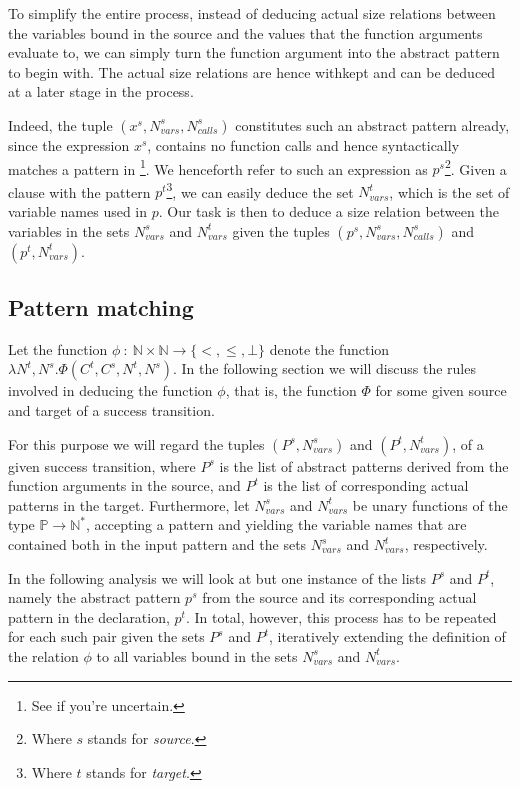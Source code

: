 To simplify the entire process, instead of deducing actual size relations
between the variables bound in the source and the values that the function
arguments evaluate to, we can simply turn the function argument into the
abstract pattern to begin with. The actual size relations are hence withkept
and can be deduced at a later stage in the process.

Indeed, the tuple $(x^s,N_{vars}^s,N_{calls}^s)$ constitutes such an abstract
pattern already, since the expression $x^s$, contains no function calls and
hence syntactically matches a pattern in \D{}\footnote{See
 if you're uncertain.}. We henceforth refer to such an
expression as $p^s$\footnote{Where $s$ stands for \emph{source}.}. Given a
clause with the pattern $p^t$\footnote{Where $t$ stands for \emph{target}.}, we
can easily deduce the set $N_{vars}^t$, which is the set of variable names used
in $p$. Our task is then to deduce a size relation between the variables in the
sets $N_{vars}^s$ and $N_{vars}^t$ given the tuples
$(p^s,N_{vars}^s,N_{calls}^s)$ and $(p^t,N_{vars}^t)$.

\subsection{Pattern matching}

Let the function $\phi\ :\ \mathbb{N} \times \mathbb{N} \rightarrow
\{<,\leq,\bot\}$ denote the function $\lambda N^t, N^s .
\Phi\left(C^t,C^s,N^t,N^s\right)$. In the following section we will discuss the
rules involved in deducing the function $\phi$, that is, the function $\Phi$
for some given source and target of a success transition.

For this purpose we will regard the tuples $(P^s,N_{vars}^s)$ and
$(P^t,N_{vars}^t)$, of a given success transition, where $P^s$ is the list of
abstract patterns derived from the function arguments in the source, and $P^t$
is the list of corresponding actual patterns in the target. Furthermore, let
$N_{vars}^s$ and $N_{vars}^t$ be unary functions of the type
$\mathbb{P}\rightarrow\mathbb{N}^*$, accepting a pattern and yielding the
variable names that are contained both in the input pattern and the sets
$N_{vars}^s$ and $N_{vars}^t$, respectively.

In the following analysis we will look at but one instance of the lists $P^s$
and $P^t$, namely the abstract pattern $p^s$ from the source and its
corresponding actual pattern in the declaration, $p^t$. In total, however, this
process has to be repeated for each such pair given the sets $P^s$ and $P^t$,
iteratively extending the definition of the relation $\phi$ to all variables
bound in the sets $N_{vars}^s$ and $N_{vars}^t$.

